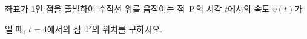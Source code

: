 좌표가 1인 점을 출발하여 수직선 위를 움직이는 점~$\mathrm{P}$의 시각 $t$에서의 속도 $v(t)$가\par\smallskip{}\par\smallskip\noindent 일 때, $t=4$에서의 점~$\mathrm{P}$의 위치를 구하시오.
